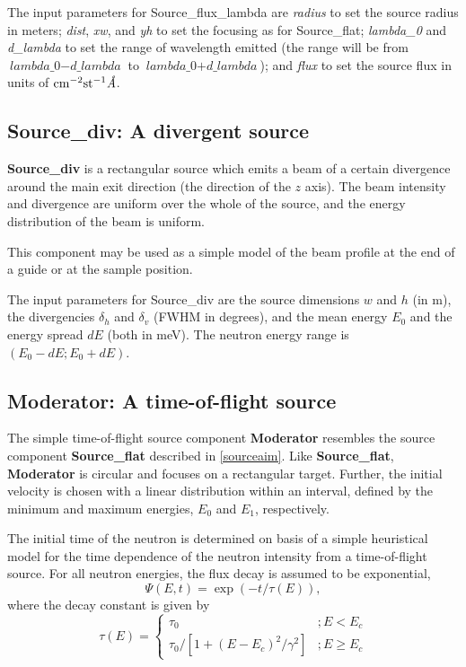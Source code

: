 The input parameters for Source\_flux\_lambda are \textit{radius} to set
the source radius in meters; \textit{dist}, \textit{xw}, and \textit{yh}
to set the focusing as for Source\_flat; \textit{lambda\_0} and
\textit{d\_lambda} to set the range of wavelength emitted (the range
will be from $\textit{lambda\_0} - \textit{d\_lambda}$ to
$\textit{lambda\_0} + \textit{d\_lambda}$); and \textit{flux} to set the
source flux in units of ${\rm cm}^{-2} {\rm st}^{-1} \textit{\AA}$.


\subsection{Source\_div: A divergent source}

{\bf Source\_div} is a rectangular source which emits a
beam of a certain divergence around the main exit direction
(the direction of the $z$ axis).
The beam intensity and divergence are uniform over
the whole of the source, and the energy distribution
of the beam is uniform.

This component may be used as a simple model of the
beam profile at the end of a guide or at the sample
position.

The input parameters for Source\_div are the source dimensions
$w$ and $h$ (in m), the divergencies $\delta_h$ and $\delta_v$ (FWHM in degrees), 
and the mean energy $E_0$ and the energy spread $dE$ (both in meV).
The neutron energy range is $(E_0-dE; E_0+dE)$. 


\subsection{Moderator: A time-of-flight source}
The simple time-of-flight source component {\bf Moderator} resembles
the source component {\bf Source\_flat} described in \ref{sourceaim}.
Like {\bf Source\_flat}, {\bf Moderator} is circular and focuses
on a rectangular target. Further, the initial velocity is chosen
with a linear distribution within an interval, defined by the
minimum and maximum energies, $E_0$ and $E_1$,
respectively.

The initial time of the neutron is determined on basis of a 
simple heuristical model for the time dependence of the 
neutron intensity from a time-of-flight source.
For all neutron energies, the flux decay is assumed to be exponential,
\begin{equation}
\Psi(E,t) = \exp(-t/\tau(E)) ,
\end{equation}
where the decay constant is given by
\begin{equation}
\tau(E) = \left\{ 
\begin{array}{cc}
 \tau_0                               & ; E<E_c \\
 \tau_0 / [ 1 + (E-E_c)^2/\gamma^2 ]  & ; E \geq E_c
\end{array}
\right.
\end{equation}

